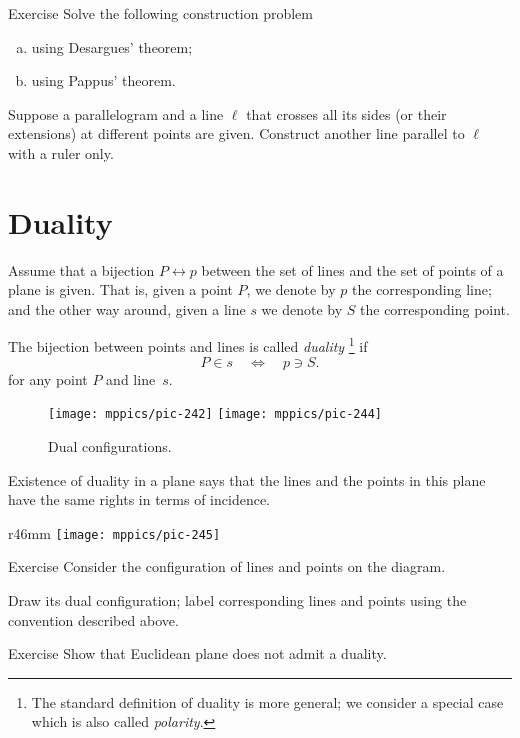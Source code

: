 \begin{thm}{Exercise}\label{ex:desargues-construction}
Solve the following construction problem
\begin{enumerate}[(a)]
\item\label{ex:desargues-construction:desargues} using Desargues' theorem;
\item\label{ex:desargues-construction:pappus} using Pappus' theorem.
\end{enumerate}
Suppose a parallelogram and a line $\ell$ that crosses all its sides (or their extensions) at different points are given. 
Construct another line parallel to $\ell$ with a ruler only.
\end{thm}


\section*{Duality}



Assume that a bijection $P\leftrightarrow p$ between the set of lines and the set of points of a plane is given.
That is,
given a point $P$, we denote by $p$ the corresponding line;
and the other way around, 
given a line $s$ we denote by $S$ the corresponding point. 

The bijection between points and lines is called \emph{duality}\label{page:duality}%
\footnote{The standard definition of duality is more general; we consider a special case which is also called \emph{polarity}.}
if 
\[P\in s
\quad
\iff
\quad 
p\ni S.\]
for any point $P$ and line~$s$.

\begin{figure}[h!]
\centering
\texttt{[image: mppics/pic-242]}
\hskip15mm
\texttt{[image: mppics/pic-244]}
\caption*{Dual configurations.}
\end{figure}

Existence of duality in a plane 
says that the lines and the points in this plane have the same rights in terms of incidence.

{

\begin{wrapfigure}{r}{46mm}
\vskip-4mm
\centering
\texttt{[image: mppics/pic-245]}
\end{wrapfigure}

\begin{thm}{Exercise}\label{ex:dual-configurations}
Consider the configuration of lines and points on the diagram.

Draw its dual configuration; label corresponding lines and points using the convention described above.
\end{thm}

\begin{thm}{Exercise}\label{ex:dual-euclid}
Show that Euclidean plane does not admit a duality. 
\end{thm}

}

